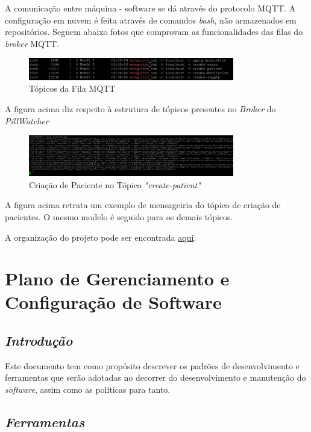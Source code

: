 \begin{apendicesenv}
A comunicação entre máquina - software se dá através do protocolo MQTT. A configuração em nuvem é feita através de comandos \textit{bash}, não armazenados em repositórios. Seguem abaixo fotos que comprovam as funcionalidades das filas do \textit{broker} MQTT.

\begin{figure}[H]
    \centering
    \includegraphics[width=0.8\textwidth]{figuras/software/mqtt/FilasBroker.JPG}
    \caption{Tópicos da Fila MQTT}
    \label{fig:filas_broker}
\end{figure}

A figura acima diz respeito à estrutura de tópicos presentes no \textit{Broker} do \textit{PillWatcher}

\begin{figure}[H]
    \centering
    \includegraphics[width=0.8\textwidth]{figuras/software/mqtt/CriacaoPatient.JPG}
    \caption{Criação de Paciente no Tópico \textit{"create-patient"}}
    \label{fig:criacao_patient_mqtt}
\end{figure}

A figura acima retrata um exemplo de mensageiria do tópico de criação de pacientes. O mesmo modelo é seguido para os demais tópicos.


A organização do projeto pode ser encontrada \href{https://github.com/PillWatcher}{aqui}.

\chapter{Plano de Gerenciamento e
Configuração de Software}

\section{\textit{Introdução}}
Este documento tem como propósito descrever os padrões de desenvolvimento e
ferramentas que serão adotadas no decorrer do desenvolvimento e manutenção do \textit{software},
assim como as políticas para tanto.

\section{\textit{Ferramentas}}


\end{apendicesenv}

